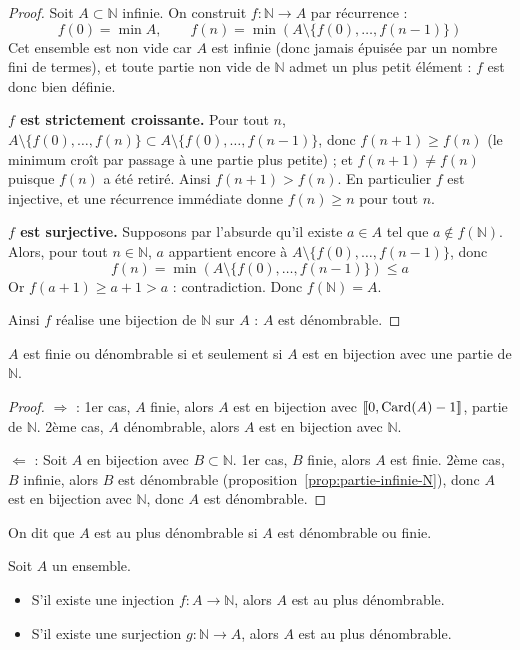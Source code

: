 \begin{proof}
Soit $A\subset\mathbb{N}$ infinie. On construit $f:\mathbb{N}\to A$ par récurrence :
\[f(0) = \min A, \qquad f(n) = \min\left(A\setminus\{f(0),\dots,f(n-1)\}\right)\]
Cet ensemble est non vide car $A$ est infinie (donc jamais épuisée par un nombre fini de termes), et toute partie non vide de $\mathbb{N}$ admet un plus petit élément : $f$ est donc bien définie.

\textbf{$f$ est strictement croissante.} Pour tout $n$, $A\setminus\{f(0),\dots,f(n)\} \subset A\setminus\{f(0),\dots,f(n-1)\}$, donc $f(n+1)\geq f(n)$ (le minimum croît par passage à une partie plus petite) ; et $f(n+1)\neq f(n)$ puisque $f(n)$ a été retiré. Ainsi $f(n+1)>f(n)$. En particulier $f$ est injective, et une récurrence immédiate donne $f(n)\geq n$ pour tout $n$.

\textbf{$f$ est surjective.} Supposons par l'absurde qu'il existe $a\in A$ tel que $a\notin f(\mathbb{N})$. Alors, pour tout $n\in\mathbb{N}$, $a$ appartient encore à $A\setminus\{f(0),\dots,f(n-1)\}$, donc
\[f(n)=\min\left(A\setminus\{f(0),\dots,f(n-1)\}\right)\leq a\]
Or $f(a+1)\geq a+1>a$ : contradiction. Donc $f(\mathbb{N})=A$.

Ainsi $f$ réalise une bijection de $\mathbb{N}$ sur $A$ : $A$ est dénombrable.
\end{proof}

\begin{prop}
\label{prop:bijection-partie-N}
$A$ est finie ou dénombrable si et seulement si $A$ est en bijection avec une partie de $\mathbb{N}$.
\end{prop}

\begin{proof}
$\Rightarrow$ : 1er cas, $A$ finie, alors $A$ est en bijection avec $\llbracket 0,\operatorname{Card}(A)-1 \rrbracket$, partie de $\mathbb{N}$. 2ème cas, $A$ dénombrable, alors $A$ est en bijection avec $\mathbb{N}$.

$\Leftarrow$ : Soit $A$ en bijection avec $B\subset\mathbb{N}$. 1er cas, $B$ finie, alors $A$ est finie. 2ème cas, $B$ infinie, alors $B$ est dénombrable (proposition~\ref{prop:partie-infinie-N}), donc $A$ est en bijection avec $\mathbb{N}$, donc $A$ est dénombrable.
\end{proof}

\begin{defi}
On dit que $A$ est au plus dénombrable si $A$ est dénombrable ou finie.
\end{defi}

\begin{prop}
\label{prop:injection-surjection-N}
Soit $A$ un ensemble.
\begin{itemize}
\item S'il existe une injection $f : A \to \mathbb{N}$, alors $A$ est au plus dénombrable.
\item S'il existe une surjection $g : \mathbb{N} \to A$, alors $A$ est au plus dénombrable.
\end{itemize}
\end{prop}

